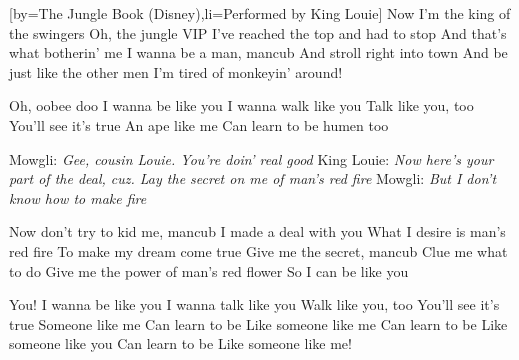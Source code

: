 [by={The Jungle Book (Disney)},li={Performed by King Louie}]
\beginverse
Now I'm the king of the swingers
Oh, the jungle VIP
I've reached the top and had to stop
And that's what botherin' me
I wanna be a man, mancub
And stroll right into town
And be just like the other men
I'm tired of monkeyin' around!
\endverse

\beginchorus
Oh, oobee doo
I wanna be like you
I wanna walk like you
Talk like you, too
You'll see it's true
An ape like me
Can learn to be humen too
\endchorus

\beginverse
Mowgli:
\textit{Gee, cousin Louie. You're doin' real good}
King Louie:
\textit{Now here's your part of the deal, cuz. Lay the secret on me of man's red fire}
Mowgli:
\textit{But I don't know how to make fire}
\endverse

\beginverse
Now don't try to kid me, mancub
I made a deal with you
What I desire is man's red fire
To make my dream come true
Give me the secret, mancub
Clue me what to do
Give me the power of man's red flower
So I can be like you
\endverse

\beginchorus
You!
I wanna be like you
I wanna talk like you
Walk like you, too
You'll see it's true
Someone like me
Can learn to be
Like someone like me
Can learn to be
Like someone like you
Can learn to be
Like someone like me!
\endchorus
\endsong